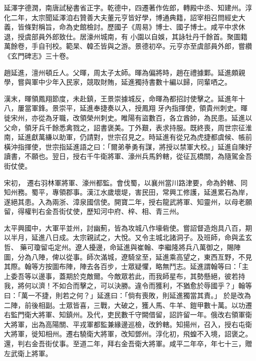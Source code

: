 \begin{pinyinscope}
 延澤字德潤，南唐試秘書省正字。乾德中，四遷著作佐郎，轉殿中丞、知建州。淳化二年，太宗聞延澤洎右贊善大夫董元亨皆好學，博通典籍，詔宰相召問經史大義，皆條對稱旨，命為史館檢討。歷國子《周易》博士、國子博士。咸平中求休退，授虞部員外郎致仕。居濠州城南，有
 小園以自娛，其詠牡丹千餘首。聚圖籍萬餘卷，手自刊校。範杲、韓丕皆與之游。景德初卒。元亨亦至虞部員外郎，嘗纘《玄門碑志》三十卷。



 趙延進，澶州頓丘人。父暉，周太子太師。暉為偏將時，趙在禮據鄴。延進頗親學，嘗與軍中少年入民家，競取財賄，延進獨持書數十編以歸，同輩哂之。



 漢末，暉領鳳翔節度，未赴鎮，王景崇據城反，命暉為都招討使擊之。延進年十八，屢當軍鋒。景崇平，延進奉捷奏以入，授鳳翔
 牙內指揮使，領貴州刺史。暉徙宋州，亦從為牙職，改領榮州刺史。睢陽有盜數百，各立酋帥，為民患。延進以父命，領牙兵千餘悉禽戮之，詔書褒美。丁外艱，表求持服。既終喪，周世宗征淮南，延進獻萬縑以助軍，仍請對，世宗召見之。時延進有從兄為虎捷都虞候、帳前橫沖指揮使，世宗指延進語之曰：「爾弟拳勇有謀，將授以禁軍大校。」延進自陳好讀書，不願也。翌日，授右千牛衛將軍、濠州兵馬鈐轄，從征瓦橋關，為隨駕金吾街仗使。



 宋初，
 遷右羽林軍將軍、濠州都監。會伐蜀，以襄州當川路津要，命為鈐轄、同知州務。蜀平，專領郡事。漢江水歲壞堤，害民田，常興工修護，延進累石為岸，遂絕其患。入為兩浙、漳泉國信使。開寶二年，授右龍武將軍、知靈州，以母老願留，得權判右金吾街仗使，歷知河中府、梓、相、青三州。



 太平興國中，大軍平並州，討幽薊，皆為攻城八作壕砦使。嘗詔督造炮具八百，期以半月，延進八日成。太宗親試之，大悅。又令主城北諸洞子。及班師，命與孟玄哲、
 藥可瓊留屯定州。遼人擾邊，命延進與崔翰、李繼隆將兵八萬御之，賜陣圖，分為八陣，俾以從事。師次滿城，遼騎坌至，延進乘高望之，東西亙野，不見其際。翰等方按圖布陣，陣去各百步，士眾疑懼，略無鬥志。延進謂翰等曰：「主上委吾等以邊事，蓋期於克敵爾。今敵眾若此，而我師星布，其勢懸絕，彼若持我，將何以濟！不如合而擊之，可以決勝。違令而獲利，不猶愈於辱國乎？」翰等曰：「萬一不捷，則若之何？」延進曰：「倘有喪敗，則延進獨當其責。」
 於是改為二陣，前後相副。士眾皆喜，三戰，大破之，獲人馬、牛羊、鎧甲數十萬。以功遷右監門衛大將軍、知鎮州。及代，吏民數千守闕借留，詔許留一年。俄改右領軍衛大將軍，出為高陽關、平戎軍都監兼緣邊巡檢，改鈐轄。知揚州，召入，授右屯衛大將軍，徙知相州。遷右驍衛大將軍，改知鄧州。淳化初，飛蝗不入境，詔褒之。還，判右金吾街仗事。至道二年，拜右金吾衛大將軍。咸平二年卒，年七十三，贈左武衛上將軍。




\end{pinyinscope}
